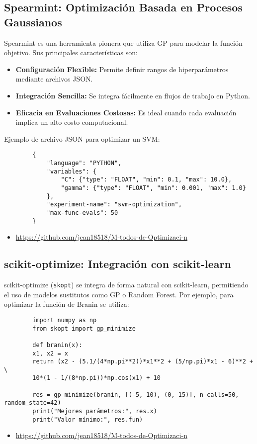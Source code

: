 \documentclass[12pt]{article}
\begin{document}
	\subsection{Spearmint: Optimización Basada en Procesos Gaussianos}
	Spearmint es una herramienta pionera que utiliza GP para modelar la función objetivo. Sus principales características son:
	\begin{itemize}[leftmargin=1.5cm]
		\item \textbf{Configuración Flexible:} Permite definir rangos de hiperparámetros mediante archivos JSON.
		\item \textbf{Integración Sencilla:} Se integra fácilmente en flujos de trabajo en Python.
		\item \textbf{Eficacia en Evaluaciones Costosas:} Es ideal cuando cada evaluación implica un alto costo computacional.
	\end{itemize}
	Ejemplo de archivo JSON para optimizar un SVM:
	\begin{verbatim}
		{
			"language": "PYTHON",
			"variables": {
				"C": {"type": "FLOAT", "min": 0.1, "max": 10.0},
				"gamma": {"type": "FLOAT", "min": 0.001, "max": 1.0}
			},
			"experiment-name": "svm-optimization",
			"max-func-evals": 50
		}
	\end{verbatim}
	\begin{itemize}
		\item \url{https://github.com/jean18518/M-todos-de-Optimizaci-n}
	\end{itemize}
	\lipsum[17]
	
	\subsection{scikit-optimize: Integración con scikit-learn}
	scikit-optimize (\texttt{skopt}) se integra de forma natural con scikit-learn, permitiendo el uso de modelos sustitutos como GP o Random Forest. Por ejemplo, para optimizar la función de Branin se utiliza:
	\begin{verbatim}
		import numpy as np
		from skopt import gp_minimize
		
		def branin(x):
		x1, x2 = x
		return (x2 - (5.1/(4*np.pi**2))*x1**2 + (5/np.pi)*x1 - 6)**2 + \
		10*(1 - 1/(8*np.pi))*np.cos(x1) + 10
		
		res = gp_minimize(branin, [(-5, 10), (0, 15)], n_calls=50, random_state=42)
		print("Mejores parámetros:", res.x)
		print("Valor mínimo:", res.fun)
	\end{verbatim}
	\begin{itemize}
		\item \url{https://github.com/jean18518/M-todos-de-Optimizaci-n}
	\end{itemize}
	\lipsum[18]
	
\end{document}
